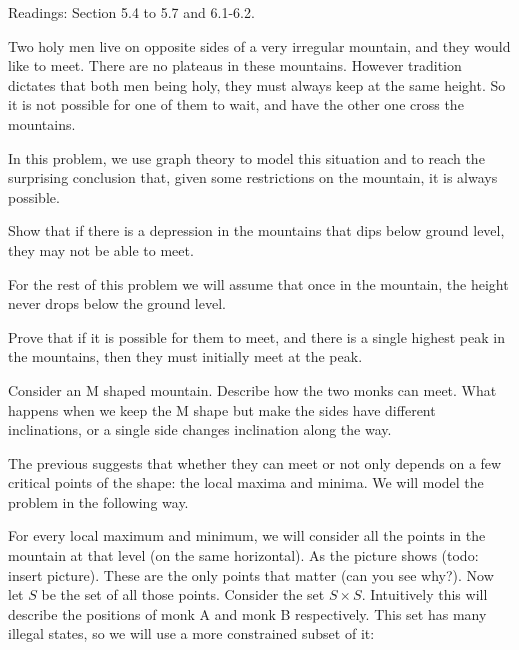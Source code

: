 \documentclass{article}
\begin{document}
Readings: Section 5.4 to 5.7 and 6.1-6.2.

\begin{problem}{0}
Two holy men live on opposite sides of a very irregular mountain, and they would like to meet.  There are no plateaus in these mountains. However tradition dictates that both men being holy, they must always keep at the same height.  So it is not possible for one of them to wait, and have the other one cross the mountains. 

 In this problem, we use graph theory to model this situation and to reach the surprising conclusion that, given some restrictions on the mountain, it is always possible.

Show that if there is a depression in the mountains that dips below ground level, they may not be able to meet.



For the rest of this problem we will assume that once in the mountain, the height never drops below the ground level.

Prove that if it is possible for them to meet, and there is a single highest peak in the mountains, then they must initially meet at the peak.


Consider an M shaped mountain. Describe how the two monks can meet. What happens when we keep the M shape but make the sides have different inclinations, or a single side changes inclination along the way.


The previous suggests that whether they can meet or not only depends on a few critical points of the shape: the local maxima and minima.  We will model the problem in the following way.

For every local maximum and minimum, we will consider all the points in the mountain at that level (on the same horizontal). As the picture shows (todo: insert picture). These are the only points that matter (can you see why?). Now let \( S \) be the set of all those points. Consider the set \( S \times S \). Intuitively this will describe the positions of monk A and monk B respectively. This set has many illegal states, so we will use a more constrained subset of it:


\end{problem}
\end{document}
